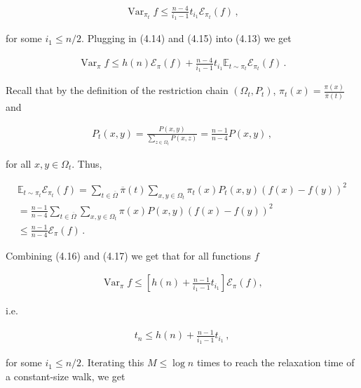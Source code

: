 \[\begin{gathered}
\operatorname{Var}_{\pi_{t}}f\leq\frac{n-4}{i_{1}-1}t_{i_{1}}\mathcal{E}_{\pi_{t}}(f)\,,
\end{gathered}\]


for some $i_{1}\leq n/2$.
Plugging in (4.14) and (4.15) into (4.13) we get\par


\[\begin{gathered}
\operatorname{Var}_{\pi}f\leq h(n)\mathcal{E}_{\pi}(f)+\frac{n-4}{i_{1}-1}t_{i_{1}}\mathbb{E}_{t\sim\pi_{t}}\mathcal{E}_{\pi_{t}}(f)\,.
\end{gathered}\]


Recall that by the definition of the restriction chain $(\Omega_{t},P_{t})$, $\pi_{t}(x)=\frac{\pi(x)}{\overline{\pi}(t)}$ and\par


\[\begin{gathered}
P_{t}(x,y)=\frac{P(x,y)}{\sum_{z\in\Omega_{t}}P(x,z)}=\frac{n-1}{n-4}P(x,y)\,,
\end{gathered}\]


for all $x,y\in\Omega_{t}$. Thus,\par


\[\begin{gathered}
\displaystyle\mathbb{E}_{t\sim\pi_{t}}\mathcal{E}_{\pi_{t}}(f) \displaystyle=\sum_{t\in\overline{\Omega}}\overline{\pi}(t)\sum_{x,y\in\Omega_{t}}\pi_{t}(x)P_{t}(x,y)(f(x)-f(y))^{2} \\
\displaystyle=\frac{n-1}{n-4}\sum_{t\in\overline{\Omega}}\sum_{x,y\in\Omega_{t}}\pi(x)P(x,y)(f(x)-f(y))^{2} \\
\displaystyle\leq\frac{n-1}{n-4}\mathcal{E}_{\pi}(f)\,.
\end{gathered}\]


Combining (4.16) and (4.17) we get that for all functions $f$\par


\[\begin{gathered}
\operatorname{Var}_{\pi}f\leq\left[h(n)+\frac{n-1}{i_{1}-1}t_{i_{1}}\right]\mathcal{E}_{\pi}(f),
\end{gathered}\]


i.e.\par


\[\begin{gathered}
t_{n}\leq h(n)+\frac{n-1}{i_{1}-1}t_{i_{1}}\,,
\end{gathered}\]


for some $i_{1}\leq n/2$. Iterating this $M\leq\log n$ times to reach the relaxation time of a constant-size walk, we get\par


